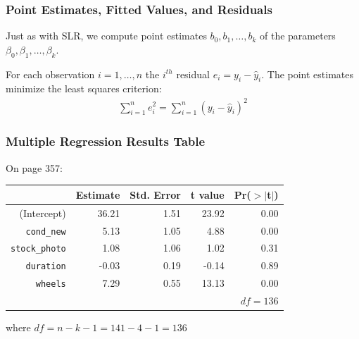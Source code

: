 \documentclass[handout]{beamer}
\newcommand{\blue}[1]{\textcolor{blue2}{#1}}
\begin{document}
\begin{frame}[fragile]
\frametitle{Point Estimates, Fitted Values, and Residuals}
%
%
Just as with SLR, we compute \blue{point estimates} $b_0, b_1, \ldots, b_k$ of the \blue{parameters} $\beta_0, \beta_1, \ldots, \beta_k$.

\pause\vspace{0.5cm}

For each observation $i=1,\ldots,n$ the $i^{th}$ \blue{residual} $e_i=y_i - \widehat{y}_i$.  The point estimates minimize the \blue{least squares criterion}:
\begin{eqnarray*}
\sum_{i=1}^{n} e_i^2 = \sum_{i=1}^{n} (y_i - \widehat{y}_i)^2
\end{eqnarray*}

\end{frame}


\begin{frame}[fragile]
\frametitle{Multiple Regression Results Table}

On page 357:
\begin{table}[ht]
\centering
\begin{tabular}{r|rrrr}
  \hline
 & Estimate & Std. Error & t value & Pr($>$$|$t$|$) \\ 
  \hline
(Intercept) & 36.21 & 1.51 & 23.92 & 0.00 \\ 
{\tt cond\_new} & 5.13 & 1.05 & 4.88 & 0.00 \\ 
{\tt stock\_photo} & 1.08 & 1.06 & 1.02 & 0.31 \\ 
{\tt duration} & -0.03 & 0.19 & -0.14 & 0.89 \\ 
{\tt wheels} & 7.29 & 0.55 & 13.13 & 0.00 \\ 
   \hline
   & & & & $df=136$\\
\end{tabular}
\end{table}
where $df=n-k-1=141-4-1=136$
\end{frame}
\end{document}
